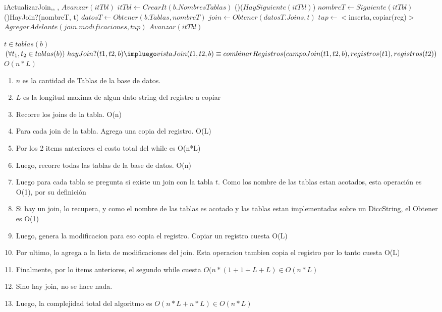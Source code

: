 \begin{Algoritmos}
\begin{algoritmo}{iActualizarJoin}{,, , }{}
{{        }
        $Avanzar(itTbl) $         
    }
    $itTbl \gets CrearIt(b.NombresTablas)$ 
    \While(){($HaySiguiente(itTbl)$)}{
    	$nombreT \gets Siguiente(itTbl)$ 
        \If(){HayJoin?(nombreT, t)}{
            $datosT \gets Obtener(b.Tablas, nombreT)$ 
        	$join \gets Obtener(datosT.Joins, t) $ 
            $tup \gets <$inserta$, $copiar(reg)$> $ 
	        $AgregarAdelante(join.modificaciones, tup) $ 
        }
        $Avanzar(itTbl) $     
    }
\end{algoritmo}

\datosAlgoritmo{} %
{$t \in tablas(b) $} %
{$ (\forall t_{1}, t_{2} \in tablas(b)) \ hayJoin?(t1,t2,b) \impluego vistaJoin(t1,t2,b) \equiv combinarRegistros(campoJoin(t1,t2,b), registros(t1), registros(t2)) $} %
{$O(n*L)$} %
{\begin{enumerate}
	\item $n$ es la cantidad de Tablas de la base de datos.
    \item $L$ es la longitud maxima de algun dato string del registro a copiar
	\item Recorre los joins de la tabla. O(n)
    \item Para cada join de la tabla. Agrega una copia del registro. O(L)
    \item Por los 2 items anteriores el costo total del while es O(n*L)
    \item Luego, recorre todas las tablas de la base de datos. O(n)
    \item Luego para cada tabla se pregunta si existe un join con la tabla $t$. Como los nombre de las tablas estan acotados, esta operaci\'on es O(1), por su definici\'on
    \item Si hay un join, lo recupera, y como el nombre de las tablas es acotado y las tablas estan implementadas sobre un DiccString, el Obtener es O(1)
    \item Luego, genera la modificacion para eso copia el registro. Copiar un registro cuesta O(L)
    \item Por ultimo, lo agrega a la lista de modificaciones del join. Esta operacion tambien copia el registro por lo tanto cuesta O(L)
    \item Finalmente, por lo items anteriores, el segundo while cuesta $O(n*(1+1+L+L) \in O(n*L)$
    \item Sino hay join, no se hace nada.
    \item Luego, la complejidad total del algoritmo es $O(n*L + n*L) \in O(n*L)$
\end{enumerate}} %




\end{Algoritmos}
